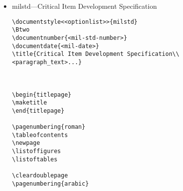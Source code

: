 \begin{itemize}
\begin{small}
\begin{verbatim}
\subsection{Quality conformance inspections.}

\section{PREPARATION FOR DELIVERY}

\section{NOTES}

\appendix
%
% \section will now generate appendices starting with section 10, 20, etc.
%
\section{<text>} % Section 10, Appendix I

\section{<text>} % Section 20, Appendix II


\end{verbatim}
\end{small}

\item milstd---Critical Item Development Specification 

\begin{small}
\begin{verbatim}
\documentstyle<<optionlist>>{milstd}
\Btwo
\documentnumber{<mil-std-number>}
\documentdate{<mil-date>}
\title{Critical Item Development Specification\\
<paragraph_text>...}



\begin{titlepage}
\maketitle
\end{titlepage}

\pagenumbering{roman}
\tableofcontents
\newpage
\listoffigures
\listoftables

\cleardoublepage
\pagenumbering{arabic}


\end{verbatim}
\end{small}
\end{itemize}
